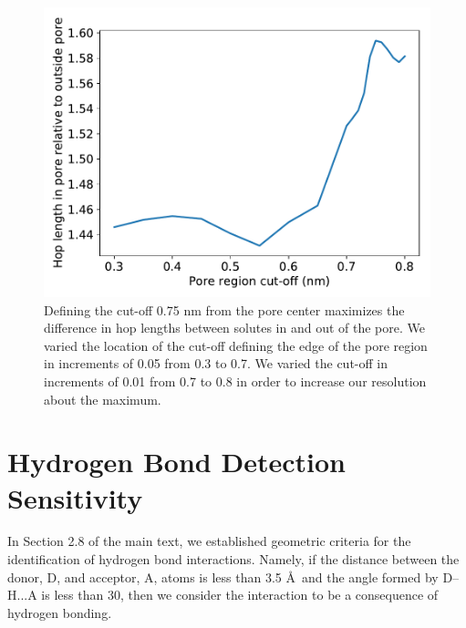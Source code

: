 \documentclass{article}
\begin{document}
  \begin{figure}
  \centering
  \includegraphics[width=0.5\linewidth]{pore_cutoff.pdf}
  \caption{Defining the cut-off 0.75 nm from the pore center maximizes the 
  difference in hop lengths between solutes in and out of the pore. We 
  varied the location of the cut-off defining the edge of the pore region
  in increments of 0.05 from 0.3 to 0.7. We varied the cut-off in 
  increments of 0.01 from 0.7 to 0.8 in order to increase our resolution
  about the maximum.}\label{fig:pore_cutoff}
  \end{figure}

  \clearpage
  \section{Hydrogen Bond Detection Sensitivity}\label{section:hbond_sensitivity}
  
  In Section 2.8 of the main text, we established geometric criteria for the 
  identification of hydrogen bond interactions. Namely, if the distance between the donor,
  D, and acceptor, A, atoms is less than 3.5 \AA~and the angle formed by D--H...A is less
  than 30\degree, then we consider the interaction to be a consequence of hydrogen bonding.
  
\end{document}
